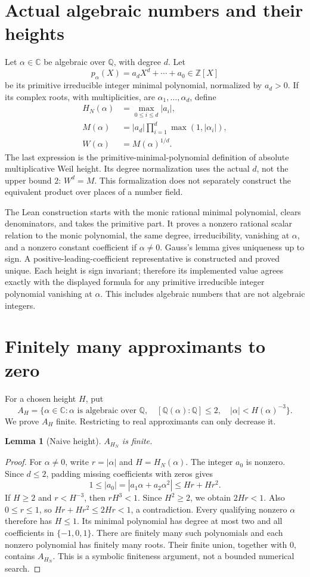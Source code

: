 \documentclass[11pt]{article}
\newtheorem{lemma}{Lemma}
\newcommand{\C}{\mathbb C}
\newcommand{\Q}{\mathbb Q}
\newcommand{\Z}{\mathbb Z}
\begin{document}
\section{Actual algebraic numbers and their heights}
Let $\alpha\in\C$ be algebraic over $\Q$, with degree $d$. Let
\[
 p_\alpha(X)=a_dX^d+\cdots+a_0\in\Z[X]
\]
be its primitive irreducible integer minimal polynomial, normalized by $a_d>0$.
If its complex roots, with multiplicities, are $\alpha_1,\ldots,\alpha_d$, define
\begin{align*}
 H_N(\alpha)&=\max_{0\leq i\leq d}|a_i|,\\
 M(\alpha)&=|a_d|\prod_{i=1}^d\max(1,|\alpha_i|),\\
 W(\alpha)&=M(\alpha)^{1/d}.
\end{align*}
The last expression is the primitive-minimal-polynomial definition of absolute
multiplicative Weil height. Its degree normalization uses the actual $d$, not
the upper bound $2$: $W^d=M$. This formalization does not separately construct
the equivalent product over places of a number field.

The Lean construction starts with the monic rational minimal polynomial,
clears denominators, and takes the primitive part. It proves a nonzero rational
scalar relation to the monic polynomial, the same degree, irreducibility,
vanishing at $\alpha$, and a nonzero constant coefficient if $\alpha\ne0$.
Gauss's lemma gives uniqueness up to sign. A positive-leading-coefficient
representative is constructed and proved unique. Each height is sign invariant;
therefore its implemented value agrees exactly with the displayed formula for
any primitive irreducible integer polynomial vanishing at $\alpha$.
This includes algebraic numbers that are not algebraic integers.

\section{Finitely many approximants to zero}
For a chosen height $H$, put
\[
 A_H=\{\alpha\in\C:\alpha\text{ is algebraic over }\Q,\quad
 [\Q(\alpha):\Q]\leq2,\quad |\alpha|<H(\alpha)^{-3}\}.
\]
We prove $A_H$ finite. Restricting to real approximants can only decrease it.

\begin{lemma}[Naive height]
$A_{H_N}$ is finite.
\end{lemma}
\begin{proof}
For $\alpha\ne0$, write $r=|\alpha|$ and $H=H_N(\alpha)$.
The integer $a_0$ is nonzero. Since $d\leq2$, padding missing coefficients
with zeros gives
\[
 1\leq |a_0|=|a_1\alpha+a_2\alpha^2|\leq Hr+Hr^2.
\]
If $H\geq2$ and $r<H^{-3}$, then $rH^3<1$. Since $H^2\geq2$,
we obtain $2Hr<1$. Also $0\leq r\leq1$, so
$Hr+Hr^2\leq2Hr<1$, a contradiction.
Every qualifying nonzero $\alpha$ therefore has $H\leq1$.
Its minimal polynomial has degree at most two and all coefficients in
$\{-1,0,1\}$. There are finitely many such polynomials and each nonzero
polynomial has finitely many roots. Their finite union, together with $0$,
contains $A_{H_N}$. This is a symbolic finiteness argument, not a bounded
numerical search.
\end{proof}
\end{document}
